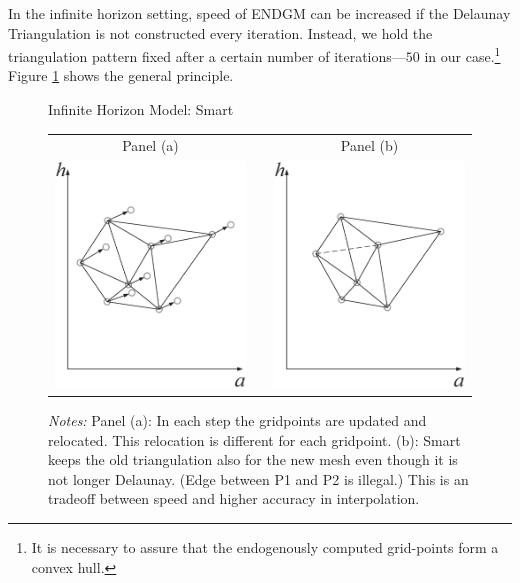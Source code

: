 \documentclass[a4paper,12pt]{article}
\begin{document}
In the infinite horizon setting, speed of ENDGM can be increased if the Delaunay Triangulation is not constructed every iteration. Instead, we hold the triangulation pattern fixed after a certain number of iterations---$50$ in our case.\footnote{It is necessary to assure that the endogenously computed grid-points form a convex hull.}
Figure \ref{graph_smart} shows the general principle. 
\begin{figure}[htb] 
	\caption{Infinite Horizon Model: Smart}
	\label{graph_smart}
	\centering
	\begin{tabular}{cC{1cm}c}
	Panel (a) & & Panel (b)  \\
	\includegraphics[height=6.0cm, width=6.0cm]{Abbildungen/Smart_1.eps} & & \includegraphics[height=6.0cm, width=6.0cm]{Abbildungen/Smart_2.eps} \\
	\end{tabular}
	\caption*{\footnotesize{\emph{Notes:} Panel (a): In each step the gridpoints are updated and relocated. This relocation is different for each gridpoint. (b): Smart keeps the old triangulation also for the new mesh even though it is not longer Delaunay. (Edge between P1 and P2 is illegal.) This is an tradeoff between speed and higher accuracy in interpolation.}}
\end{figure}
\end{document}
